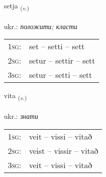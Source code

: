 \documentclass[frontgrid, backgrid]{flacards}\usepackage[]{graphicx}\usepackage[]{xcolor}
\begin{document}
\renewcommand{\flhead}{\vskip5pt \fboxsep=0pt {\small\bfseries\footnotesize Sagnorð | дієслово}}
\renewcommand{\fcfoot}{\vskip5pt \fboxsep=0pt \hspace{2pt}{\small\bfseries\footnotesize 1K}}

\renewcommand{\blhead}{\vskip5pt {\small\bfseries\footnotesize Sagnorð | дієслово }}
\renewcommand{\bcfoot}{\vskip5pt \hspace{2pt}{\small\bfseries\footnotesize 1K}}


{setja \small{\textsubscript{(\textit{v.})}} \\[1ex] %
\textphonetic{[sɛːtja]} \\
ukr.: \emph{положити; класти} \\  [2ex]
\renewcommand*{\arraystretch}{0.8}
\begin{tabular}{p{1cm}l}
\textsc{1sg}: & set -- setti -- sett \\ 
\textsc{2sg}: & setur -- settir -- sett \\ 
\textsc{3sg}: & setur -- setti -- sett \\ 
\end{tabular}
}

\renewcommand{\flhead}{\vskip5pt \fboxsep=0pt {\small\bfseries\footnotesize Sagnorð | дієслово}}
\renewcommand{\fcfoot}{\vskip5pt \fboxsep=0pt \hspace{2pt}{\small\bfseries\footnotesize 1K}}

\renewcommand{\blhead}{\vskip5pt {\small\bfseries\footnotesize Sagnorð | дієслово }}
\renewcommand{\bcfoot}{\vskip5pt \hspace{2pt}{\small\bfseries\footnotesize 1K}}


{vita \small{\textsubscript{(\textit{v.})}} \\[1ex] %
\textphonetic{[vɪːta]} \\
ukr.: \emph{знати} \\  [2ex]
\renewcommand*{\arraystretch}{0.8}
\begin{tabular}{p{1cm}l}
\textsc{1sg}: & veit -- vissi -- vitað \\ 
\textsc{2sg}: & veist -- vissir -- vitað \\ 
\textsc{3sg}: & veit -- vissi -- vitað \\ 
\end{tabular}
}
\end{document}
